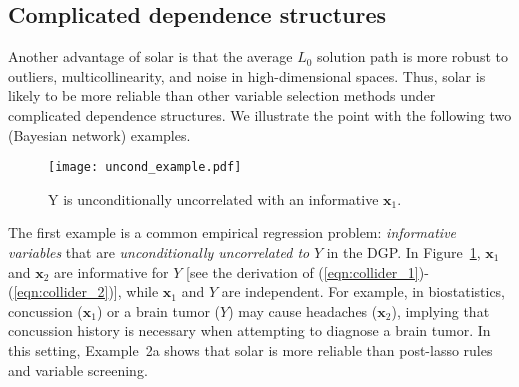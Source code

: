\documentclass[11pt,review,authoryear]{elsarticle}
\begin{document}
\subsection{Complicated dependence structures\label{section:example}}

Another advantage of solar is that the average $L_0$ solution path is more robust to outliers, multicollinearity, and noise in high-dimensional spaces. Thus, solar is likely to be more reliable than other variable selection methods under complicated dependence structures. We illustrate the point with the following two (Bayesian network) examples.

\begin{figure}[ht]
%
  \centering
  \texttt{[image: uncond\_example.pdf]}
  \caption{Y is unconditionally uncorrelated with an informative $\mathbf{x}_1$.}
  \label{fig:uncond_example}
%
\end{figure}

The first example is a common empirical regression problem: \emph{informative variables} that are \emph{unconditionally uncorrelated to} $Y$ in the DGP. In Figure~\ref{fig:uncond_example}, $\mathbf{x}_1$ and $\mathbf{x}_2$ are informative for $Y$ [see the derivation of (\ref{eqn:collider_1})-(\ref{eqn:collider_2})], while $\mathbf{x}_1$ and $Y$ are independent. For example, in biostatistics, concussion ($\mathbf{x}_1$) or a brain tumor ($Y$) may cause headaches ($\mathbf{x}_2$), implying that concussion history is necessary when attempting to diagnose a brain tumor. In this setting, Example~2a shows that solar is more reliable than post-lasso rules and variable screening.
\end{document}
